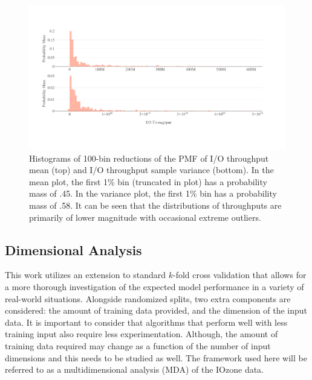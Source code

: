 \documentclass{scspaperproc}
\theoremstyle{scsthe}
\begin{document}
\begin{figure}
  \centering
  \includegraphics[width=\textwidth,trim={0 .5in 0 .4in}]{Raw_Throughput.pdf}
  \caption{Histograms of 100-bin reductions of the PMF of I/O
    throughput mean (top) and I/O throughput sample variance
    (bottom). In the mean plot, the first 1\% bin (truncated in plot)
    has a probability mass of .45. In the variance plot, the first 1\%
    bin has a probability mass of .58. It can be seen that the
    distributions of throughputs are primarily of lower magnitude with
    occasional extreme outliers.}
  \label{fig:raw_throughput}
\end{figure}

\subsection{Dimensional Analysis}
This work utilizes an extension to standard $k$-fold cross validation
that allows for a more thorough investigation of the expected model
performance in a variety of real-world situations. Alongside
randomized splits, two extra components are considered: the amount of
training data provided, and the dimension of the input data. It is
important to consider that algorithms that perform well with less
training input also require less experimentation. Although, the amount
of training data required may change as a function of the number of
input dimensions and this needs to be studied as well. The framework
used here will be referred to as a multidimensional analysis (MDA) of
the IOzone data.

\end{document}
